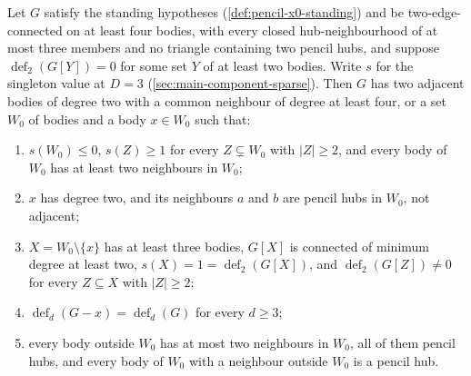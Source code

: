 \begin{lemma}
  \label{lem:pencil-d-good-ear}
  \leanok
  Let $G$ satisfy the standing hypotheses (\cref{def:pencil-x0-standing})
  and be two-edge-connected on at least four bodies, with every closed
  hub-neighbourhood of at most three members and no triangle containing
  two pencil hubs, and suppose $\operatorname{def}_2(G[Y]) = 0$ for some
  set $Y$ of at least two bodies. Write $s$ for the singleton value at
  $D = 3$ (\cref{sec:main-component-sparse}). Then $G$ has two adjacent
  bodies of degree two with a common neighbour of degree at least four,
  or a set $W_0$ of bodies and a body $x \in W_0$ such that:
  \begin{enumerate}
    \item[(i)] $s(W_0) \le 0$, $s(Z) \ge 1$ for every $Z \subsetneq W_0$
      with $|Z| \ge 2$, and every body of $W_0$ has at least two
      neighbours in $W_0$;
    \item[(ii)] $x$ has degree two, and its neighbours $a$ and $b$ are
      pencil hubs in $W_0$, not adjacent;
    \item[(iii)] $X = W_0 \setminus \{x\}$ has at least three bodies,
      $G[X]$ is connected of minimum degree at least two,
      $s(X) = 1 = \operatorname{def}_2(G[X])$, and
      $\operatorname{def}_2(G[Z]) \ne 0$ for every $Z \subseteq X$ with
      $|Z| \ge 2$;
    \item[(iv)] $\operatorname{def}_d(G - x) = \operatorname{def}_d(G)$
      for every $d \ge 3$;
    \item[(v)] every body outside $W_0$ has at most two neighbours in
      $W_0$, all of them pencil hubs, and every body of $W_0$ with a
      neighbour outside $W_0$ is a pencil hub.
  \end{enumerate}
\end{lemma}
